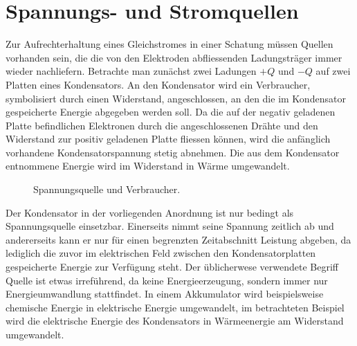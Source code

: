 \section{Spannungs- und Stromquellen}
Zur Aufrechterhaltung eines Gleichstromes in einer Schatung müssen Quellen vorhanden sein, die die von den Elektroden abfliessenden Ladungsträger immer wieder nachliefern. Betrachte man zunächst zwei Ladungen $+Q$ und $-Q$ auf zwei Platten eines Kondensators. An den Kondensator wird ein Verbraucher, symbolisiert durch einen Widerstand, angeschlossen, an den die im Kondensator gespeicherte Energie abgegeben werden soll. Da die auf der negativ geladenen Platte befindlichen Elektronen durch die angeschlossenen Drähte und den Widerstand zur positiv geladenen Platte fliessen können, wird die anfänglich vorhandene Kondensatorspannung stetig abnehmen. Die aus dem Kondensator entnommene Energie wird im Widerstand in Wärme umgewandelt.
\begin{figure}[H]
\centering
\caption{Spannungsquelle und Verbraucher.}
\label{fig_IIIc}
\end{figure}
\noindent Der Kondensator in der vorliegenden Anordnung ist nur bedingt als Spannungsquelle einsetzbar. Einerseits nimmt seine Spannung zeitlich ab und andererseits kann er nur für einen begrenzten Zeitabschnitt Leistung abgeben, da lediglich die zuvor im elektrischen Feld zwischen den Kondensatorplatten gespeicherte Energie zur Verfügung steht. Der üblicherwese verwendete Begriff Quelle ist etwas irreführend, da keine Energieerzeugung, sondern immer nur Energieumwandlung stattfindet. In einem Akkumulator wird beispielsweise chemische Energie in elektrische Energie umgewandelt, im betrachteten Beispiel wird die elektrische Energie des Kondensators in Wärmeenergie am Widerstand umgewandelt.
\newline\newline  

